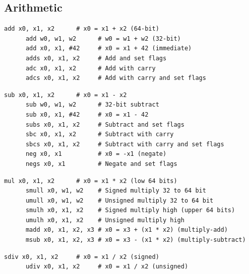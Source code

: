 \subsection{Arithmetic} 

  \begin{definition}[Addition]
    \label{def:addition}
    \begin{lstlisting}[language=arm]
      add x0, x1, x2      # x0 = x1 + x2 (64-bit)
      add w0, w1, w2      # w0 = w1 + w2 (32-bit)
      add x0, x1, #42     # x0 = x1 + 42 (immediate)
      adds x0, x1, x2     # Add and set flags
      adc x0, x1, x2      # Add with carry
      adcs x0, x1, x2     # Add with carry and set flags
    \end{lstlisting}
  \end{definition}

  \begin{definition}[Subtraction]
    \label{def:subtraction}
    \begin{lstlisting}[language=arm]
      sub x0, x1, x2      # x0 = x1 - x2
      sub w0, w1, w2      # 32-bit subtract
      sub x0, x1, #42     # x0 = x1 - 42
      subs x0, x1, x2     # Subtract and set flags
      sbc x0, x1, x2      # Subtract with carry
      sbcs x0, x1, x2     # Subtract with carry and set flags
      neg x0, x1          # x0 = -x1 (negate)
      negs x0, x1         # Negate and set flags
    \end{lstlisting}
  \end{definition}

  \begin{definition}[Multiplication]
    \label{def:multiplication}
    \begin{lstlisting}[language=arm]
      mul x0, x1, x2      # x0 = x1 * x2 (low 64 bits)
      smull x0, w1, w2    # Signed multiply 32 to 64 bit
      umull x0, w1, w2    # Unsigned multiply 32 to 64 bit
      smulh x0, x1, x2    # Signed multiply high (upper 64 bits)
      umulh x0, x1, x2    # Unsigned multiply high
      madd x0, x1, x2, x3 # x0 = x3 + (x1 * x2) (multiply-add)
      msub x0, x1, x2, x3 # x0 = x3 - (x1 * x2) (multiply-subtract)
    \end{lstlisting}
  \end{definition}

  \begin{definition}[Division]
    \label{def:division}
    \begin{lstlisting}[language=arm]
      sdiv x0, x1, x2     # x0 = x1 / x2 (signed)
      udiv x0, x1, x2     # x0 = x1 / x2 (unsigned)
    \end{lstlisting}
  \end{definition}

